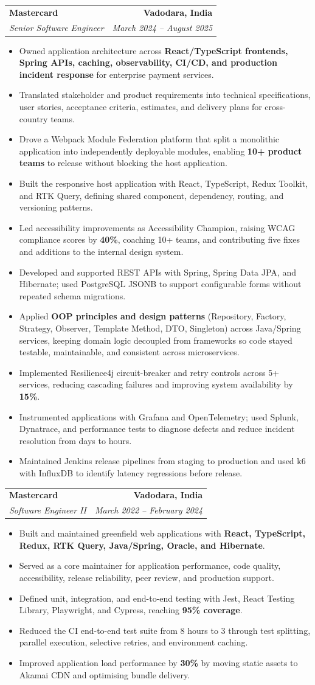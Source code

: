 \documentclass[a4paper,10pt]{article}
\makeatletter
\newcommand{\resumeItem}[1]{
  \item\small{{#1 \vspace{-2pt}}}
}
\newcommand{\resumeSubheading}[4]{
  \vspace{-2pt}\item
    \begin{tabular*}{1.0\textwidth}[t]{l@{\extracolsep{\fill}}r}
      \textbf{#1} & \textbf{\small #2} \\
      \textit{\small #3} & \textit{\small #4} \\
    \end{tabular*}\vspace{-4pt}
}
\newcommand{\resumeItemListStart}{\begin{itemize}[leftmargin=0.2in]}
\newcommand{\resumeItemListEnd}{\end{itemize}\vspace{0pt}}
\makeatother
\begin{document}
  \resumeSubheading
    {Mastercard}{Vadodara, India}
    {Senior Software Engineer}{March 2024 -- August 2025}
  \resumeItemListStart
    \resumeItem{Owned application architecture across \textbf{React/TypeScript frontends, Spring APIs, caching, observability, CI/CD, and production incident response} for enterprise payment services.}
    \resumeItem{Translated stakeholder and product requirements into technical specifications, user stories, acceptance criteria, estimates, and delivery plans for cross-country teams.}
    \resumeItem{Drove a Webpack Module Federation platform that split a monolithic application into independently deployable modules, enabling \textbf{10+ product teams} to release without blocking the host application.}
    \resumeItem{Built the responsive host application with React, TypeScript, Redux Toolkit, and RTK Query, defining shared component, dependency, routing, and versioning patterns.}
    \resumeItem{Led accessibility improvements as Accessibility Champion, raising WCAG compliance scores by \textbf{40\%}, coaching 10+ teams, and contributing five fixes and additions to the internal design system.}
    \resumeItem{Developed and supported REST APIs with Spring, Spring Data JPA, and Hibernate; used PostgreSQL JSONB to support configurable forms without repeated schema migrations.}
    \resumeItem{Applied \textbf{OOP principles and design patterns} (Repository, Factory, Strategy, Observer, Template Method, DTO, Singleton) across Java/Spring services, keeping domain logic decoupled from frameworks so code stayed testable, maintainable, and consistent across microservices.}
    \resumeItem{Implemented Resilience4j circuit-breaker and retry controls across 5+ services, reducing cascading failures and improving system availability by \textbf{15\%}.}
    \resumeItem{Instrumented applications with Grafana and OpenTelemetry; used Splunk, Dynatrace, and performance tests to diagnose defects and reduce incident resolution from days to hours.}
    \resumeItem{Maintained Jenkins release pipelines from staging to production and used k6 with InfluxDB to identify latency regressions before release.}
  \resumeItemListEnd

  \resumeSubheading
    {Mastercard}{Vadodara, India}
    {Software Engineer II}{March 2022 -- February 2024}
  \resumeItemListStart
    \resumeItem{Built and maintained greenfield web applications with \textbf{React, TypeScript, Redux, RTK Query, Java/Spring, Oracle, and Hibernate}.}
    \resumeItem{Served as a core maintainer for application performance, code quality, accessibility, release reliability, peer review, and production support.}
    \resumeItem{Defined unit, integration, and end-to-end testing with Jest, React Testing Library, Playwright, and Cypress, reaching \textbf{95\% coverage}.}
    \resumeItem{Reduced the CI end-to-end test suite from 8 hours to 3 through test splitting, parallel execution, selective retries, and environment caching.}
    \resumeItem{Improved application load performance by \textbf{30\%} by moving static assets to Akamai CDN and optimising bundle delivery.}
  \resumeItemListEnd
\end{document}
